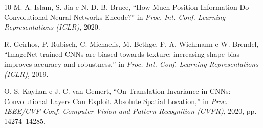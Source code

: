\documentclass[conference]{IEEEtran}
\begin{document}
\begin{thebibliography}{10}
M. A. Islam, S. Jia e N. D. B. Bruce, ``How Much Position Information Do Convolutional Neural Networks Encode?'' in \textit{Proc. Int. Conf. Learning Representations (ICLR)}, 2020.

R. Geirhos, P. Rubisch, C. Michaelis, M. Bethge, F. A. Wichmann e W. Brendel, ``ImageNet-trained CNNs are biased towards texture; increasing shape bias improves accuracy and robustness,'' in \textit{Proc. Int. Conf. Learning Representations (ICLR)}, 2019.

O. S. Kayhan e J. C. van Gemert, ``On Translation Invariance in CNNs: Convolutional Layers Can Exploit Absolute Spatial Location,'' in \textit{Proc. IEEE/CVF Conf. Computer Vision and Pattern Recognition (CVPR)}, 2020, pp. 14274--14285.

\end{thebibliography}
\end{document}
